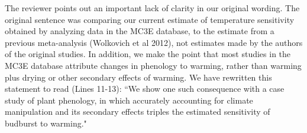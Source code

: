 \documentclass[11pt,a4paper]{letter}
\begin{document}
\begin{letter}{}
\par The reviewer points out an important lack of clarity in our original wording. The original sentence was comparing our current estimate of temperature sensitivity obtained by analyzing data in the MC3E database, to the estimate from a previous meta-analysis (Wolkovich et al 2012), not estimates made by the authors of the original studies.  In addition, we make the point that most studies in the MC3E database attribute changes in phenology to warming, rather than warming plus drying or other secondary effects of warming. We have rewritten this statement to read (Lines 11-13): ``We show one such consequence with a case study of plant phenology, in which accurately accounting for climate manipulation and its secondary effects triples the estimated sensitivity of budburst to warming."  

\\


\end{letter}
\end{document}
